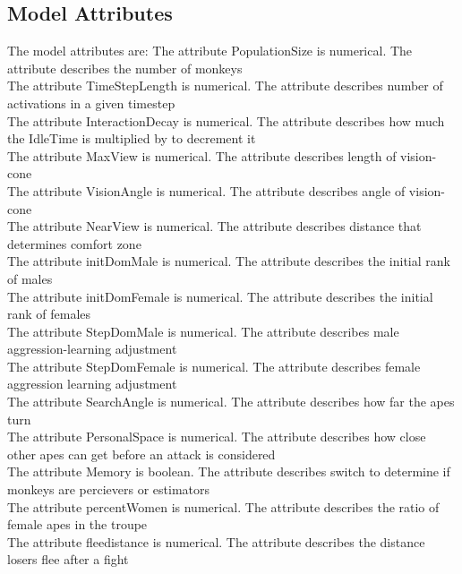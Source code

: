 \documentclass{article}
\begin{document}
\subsection{Model Attributes}
The model attributes are:         
The attribute {\color{blue}PopulationSize} is {\color{green}numerical}. The attribute describes the number of monkeys\\  
The attribute {\color{blue}TimeStepLength} is {\color{green}numerical}. The attribute describes number of activations in a given timestep\\
The attribute {\color{blue}InteractionDecay} is {\color{green}numerical}. The attribute describes how much the IdleTime is multiplied by to decrement it\\
The attribute {\color{blue}MaxView} is {\color{green}numerical}. The attribute describes length of vision-cone\\
The attribute {\color{blue}VisionAngle} is {\color{green}numerical}. The attribute describes angle of vision-cone\\
The attribute {\color{blue}NearView} is {\color{green}numerical}. The attribute describes distance that determines comfort zone\\
The attribute {\color{blue}initDomMale} is {\color{green}numerical}. The attribute describes the initial rank of males\\
The attribute {\color{blue}initDomFemale} is {\color{green}numerical}. The attribute describes the initial rank of females\\
The attribute {\color{blue}StepDomMale} is {\color{green}numerical}. The attribute describes male aggression-learning adjustment\\
The attribute {\color{blue}StepDomFemale} is {\color{green}numerical}. The attribute describes female aggression learning adjustment\\
The attribute {\color{blue}SearchAngle} is {\color{green}numerical}. The attribute describes how far the apes turn\\
The attribute {\color{blue}PersonalSpace} is {\color{green}numerical}. The attribute describes how close other apes can get before an attack is considered\\
The attribute {\color{blue}Memory} is {\color{green}boolean}. The attribute describes switch to determine if monkeys are percievers or estimators\\
The attribute {\color{blue}percentWomen} is {\color{green}numerical}. The attribute describes the ratio of female apes in the troupe\\
The attribute {\color{blue}fleedistance} is {\color{green}numerical}. The attribute describes the distance losers flee after a fight\\
\end{document}
